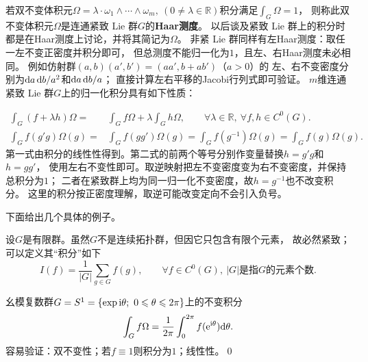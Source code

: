 若双不变体积元$\Omega=\lambda \cdot \omega_1 \wedge\cdots\wedge\omega_m,\
(0\neq\lambda\in \mathbb{R})$积分满足$\int_{G}\Omega {=} 1$，
则称此双不变体积元$\Omega$是连通紧致 Lie 群$G$的\textbf{Haar测度}。
以后谈及紧致 Lie 群上的积分时都是在Haar测度上讨论，并将其简记为$\Omega$。
非紧 Lie 群同样有左Haar测度：取任一左不变正密度并积分即可，
但总测度不能归一化为$1$，且左、右Haar测度未必相同。
例如仿射群$(a,b)(a',b')=(aa',b+ab')$（$a>0$）的
左、右不变密度分别为$\dd a\,\dd b/a^2$和$\dd a\,\dd b/a$；
直接计算左右平移的Jacobi行列式即可验证。
$m$维连通紧致 Lie 群$G$上的归一化积分具有如下性质：

\begin{align}
    \int_{G} (f+\lambda h) \Omega =& \int_{G} f \Omega +\lambda \int_{G}  h \Omega,
    \qquad \forall \lambda\in \mathbb{R},\  \forall f,h\in C^0(G). \\
    \int_{G} f(g' g) \Omega(g)=& \int_{G} f(g g') \Omega(g)
    = \int_{G} f(g^{-1}) \Omega(g) = \int_{G} f(g) \Omega(g) .
\end{align}
第一式由积分的线性性得到。第二式的前两个等号分别作变量替换$h=g'g$和$h=gg'$，
使用左右不变性即可。取逆映射把左不变密度变为右不变密度，并保持总积分为$1$；
二者在紧致群上均为同一归一化不变密度，故$h=g^{-1}$也不改变积分。
这里的积分按正密度理解，取逆可能改变定向不会引入负号。

下面给出几个具体的例子。
\begin{example}
    设$G$是有限群。虽然$G$不是连续拓扑群，但因它只包含有限个元素，
    故必然紧致；可以定义其“积分”如下
    \begin{equation}
        I(f)= \frac{1}{|G|} \sum_{g\in G} f(g),\qquad
        \forall f\in C^0(G),\ |G|\text{是指}G\text{的元素个数}.
    \end{equation}
\end{example}

\begin{example}
    幺模复数群$G=S^1=\{\exp\i \theta;\ 0\leqslant \theta \leqslant 2\pi\}$上的不变积分
    \begin{equation}
        \int_{G} f \Omega = \frac{1}{2\pi} \int_{0}^{2\pi} f(\mathrm{e}^{\mathrm{i} \theta}) \dd \theta .
    \end{equation}
    容易验证：双不变性；若$f\equiv 1$则积分为$1$；线性性。\qed
\end{example}

